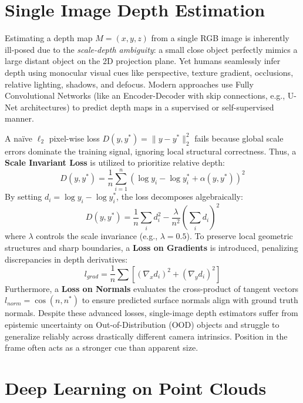 \section{Single Image Depth Estimation}

Estimating a depth map $M = (x,y,z)$ from a single RGB image is inherently ill-posed due to the \textit{scale-depth ambiguity}: a small close object perfectly mimics a large distant object on the 2D projection plane. Yet humans seamlessly infer depth using monocular visual cues like perspective, texture gradient, occlusions, relative lighting, shadows, and defocus. Modern approaches use Fully Convolutional Networks (like an Encoder-Decoder with skip connections, e.g., U-Net architectures) to predict depth maps in a supervised or self-supervised manner.

A naïve $\ell_2$ pixel-wise loss $D(y, y^*) = \|y - y^*\|_2^2$ fails because global scale errors dominate the training signal, ignoring local structural correctness. Thus, a \textbf{Scale Invariant Loss} is utilized to prioritize relative depth:
\begin{equation}
D(y, y^*) = \frac{1}{n} \sum_{i=1}^n \left( \log y_i - \log y^*_i + \alpha(y, y^*) \right)^2
\end{equation}
By setting $d_i = \log y_i - \log y^*_i$, the loss decomposes algebraically:
\begin{equation}
D(y, y^*) = \frac{1}{n} \sum_i d_i^2 - \frac{\lambda}{n^2} \left( \sum_i d_i \right)^2
\end{equation}
where $\lambda$ controls the scale invariance (e.g., $\lambda=0.5$). 
To preserve local geometric structures and sharp boundaries, a \textbf{Loss on Gradients} is introduced, penalizing discrepancies in depth derivatives:
\begin{equation}
l_{grad} = \frac{1}{n} \sum \left[ (\nabla_x d_i)^2 + (\nabla_y d_i)^2 \right]
\end{equation}
Furthermore, a \textbf{Loss on Normals} evaluates the cross-product of tangent vectors $l_{norm} = \cos(n, n^*)$ to ensure predicted surface normals align with ground truth normals.
Despite these advanced losses, single-image depth estimators suffer from epistemic uncertainty on Out-of-Distribution (OOD) objects and struggle to generalize reliably across drastically different camera intrinsics. Position in the frame often acts as a stronger cue than apparent size.

\section{Deep Learning on Point Clouds}

